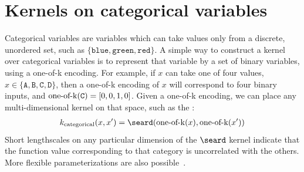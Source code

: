 


\section{Kernels on categorical variables}



Categorical variables are variables which can take values only from a discrete, unordered set, such as $\{\texttt{blue}, \texttt{green}, \texttt{red}\}$.
A simple way to construct a kernel over categorical variables is to represent that variable by a set of binary variables, using a one-of-k encoding.
For example, if $x$ can take one of four values, $x \in \{ \texttt{A}, \texttt{B}, \texttt{C}, \texttt{D}\}$, then a one-of-k encoding of $x$ will correspond to four binary inputs, and $\operatorname{one-of-k}(\texttt{C}) = [0, 0, 1, 0]$.
Given a one-of-k encoding, we can place any multi-dimensional kernel on that space, such as the \seard{}:
%
\begin{align}
k_{\textnormal{categorical}}( x, x') = \seard( \oneofk(x), \oneofk(x') )
\end{align}
%
Short lengthscales on any particular dimension of the $\seard$ kernel indicate that the function value corresponding to that category is uncorrelated with the others.
More flexible parameterizations are also possible~\citep{pinheiro1996unconstrained}.
%
%



